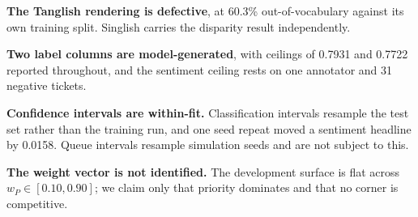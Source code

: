 \textbf{The Tanglish rendering is defective}, at 60.3\% out-of-vocabulary against
its own training split. Singlish carries the disparity result independently.

\textbf{Two label columns are model-generated}, with ceilings of 0.7931 and
0.7722 reported throughout, and the sentiment ceiling rests on one annotator and
31 negative tickets.

\textbf{Confidence intervals are within-fit.} Classification intervals resample
the test set rather than the training run, and one seed repeat moved a sentiment
headline by 0.0158. Queue intervals resample simulation seeds and are not subject
to this.

\textbf{The weight vector is not identified.} The development surface is flat
across $w_P \in [0.10, 0.90]$; we claim only that priority dominates and that no
corner is competitive.
